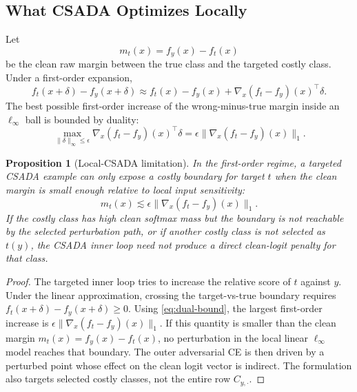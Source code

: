 \documentclass[11pt]{article}
\theoremstyle{definition}
\theoremstyle{plain}
\newtheorem{proposition}{Proposition}
\theoremstyle{remark}
\begin{document}
\subsection{What CSADA Optimizes Locally}

Let
\begin{equation}
  m_t(x)=f_y(x)-f_t(x)
\end{equation}
be the clean raw margin between the true class and the targeted costly class.
Under a first-order expansion,
\begin{equation}
  f_t(x+\delta)-f_y(x+\delta)
  \approx
  f_t(x)-f_y(x)
  +
  \nabla_x(f_t-f_y)(x)^\top \delta.
\end{equation}
The best possible first-order increase of the wrong-minus-true margin inside an
$\ell_\infty$ ball is bounded by duality:
\begin{equation}
  \max_{\|\delta\|_\infty\le \epsilon}
  \nabla_x(f_t-f_y)(x)^\top\delta
  =
  \epsilon\|\nabla_x(f_t-f_y)(x)\|_1.
  \label{eq:dual-bound}
\end{equation}

\begin{proposition}[Local-CSADA limitation]
In the first-order regime, a targeted CSADA example can only expose a costly boundary for target
$t$ when the clean margin is small enough relative to local input sensitivity:
\begin{equation}
  m_t(x)
  \lesssim
  \epsilon\|\nabla_x(f_t-f_y)(x)\|_1.
  \label{eq:reachability}
\end{equation}
If the costly class has high clean softmax mass but the boundary is not reachable by the selected
perturbation path, or if another costly class is not selected as $t(y)$, the CSADA inner loop need not
produce a direct clean-logit penalty for that class.
\end{proposition}

\begin{proof}
The targeted inner loop tries to increase the relative score of $t$ against $y$.
Under the linear approximation, crossing the target-vs-true boundary requires
$f_t(x+\delta)-f_y(x+\delta)\ge 0$.
Using \eqref{eq:dual-bound}, the largest first-order increase is
$\epsilon\|\nabla_x(f_t-f_y)(x)\|_1$.
If this quantity is smaller than the clean margin $m_t(x)=f_y(x)-f_t(x)$, no perturbation in the local
linear $\ell_\infty$ model reaches that boundary.
The outer adversarial CE is then driven by a perturbed point whose effect on the clean logit vector is indirect.
The formulation also targets selected costly classes, not the entire row $C_{y,\cdot}$.
\end{proof}
\end{document}
